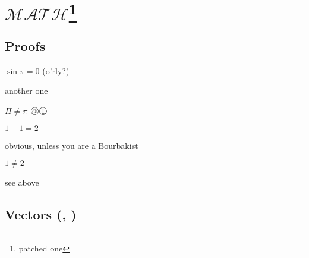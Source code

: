 \documentclass[draft]{report}
\begin{document}
\section{$\mathcal{M\!AT\!H}$\protect\footnote{patched one}}

\subsection{Proofs}
\label{sub:proofs}



\begin{tproof}[kek?]
  $\sin\pi=0$ (o'rly?)
  \begin{lproof}[nested]
    another one
    \begin{pproof}
      $\Pi\neq\pi$
      {%
        \fboxsep=0pt
        \fbox{$\bigcirc$}\fbox{$\mathord{\Rightarrow}\vphantom{<}$}
      }%
      \circlearound{$\mathord{\Rightarrow}\vphantom{>}$}%
      $\circlearound{\alpha}\,\circlearound{1}$
    \end{pproof}
  \end{lproof}
\end{tproof}


\begin{thrm}$1+1=2$\end{thrm}\begin{prf}obvious, unless you are a Bourbakist\end{prf}
\begin{lem}$1\neq2$\end{lem}\begin{prf}see above\end{prf}




\subsection{Vectors (\coori, \conori)}
\end{document}
